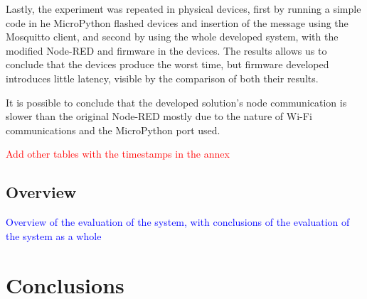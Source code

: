 Lastly, the experiment was repeated in physical devices, first by running a simple code in he MicroPython flashed devices and insertion of the message using the Mosquitto client, and second by using the whole developed system, with the modified Node-RED and firmware in the devices. The results allows us to conclude that the devices produce the worst time, but firmware developed introduces little latency, visible by the comparison of both their results.

It is possible to conclude that the developed solution's node communication is slower than the original Node-RED mostly due to the nature of Wi-Fi communications and the MicroPython port used.   

\textcolor{red}{Add other tables with the timestamps in the annex}

\subsection{Overview}\label{sec:discussion_overview}

\textcolor{blue}{Overview of the evaluation of the system, with conclusions of the evaluation of the system as a whole}

\section{Conclusions}\label{sec:evaluation_conclusions}

